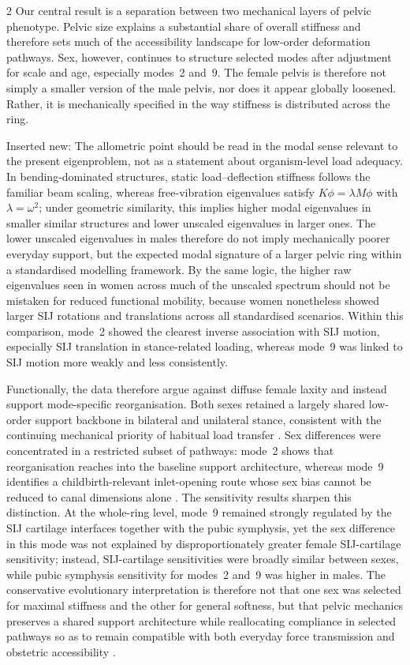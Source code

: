 \documentclass[openacc]{rsproca_new}
\begin{document}
\begin{multicols}{2}
Our central result is a separation between two mechanical layers of pelvic phenotype. Pelvic size explains a substantial share of overall stiffness and therefore sets much of the accessibility landscape for low-order deformation pathways. Sex, however, continues to structure selected modes after adjustment for scale and age, especially modes~2 and~9. The female pelvis is therefore not simply a smaller version of the male pelvis, nor does it appear globally loosened. Rather, it is mechanically specified in the way stiffness is distributed across the ring.

Inserted new: The allometric point should be read in the modal sense relevant to the present eigenproblem, not as a statement about organism-level load adequacy. In bending-dominated structures, static load--deflection stiffness follows the familiar beam scaling, whereas free-vibration eigenvalues satisfy $K\phi=\lambda M\phi$ with $\lambda=\omega^{2}$; under geometric similarity, this implies higher modal eigenvalues in smaller similar structures and lower unscaled eigenvalues in larger ones. The lower unscaled eigenvalues in males therefore do not imply mechanically poorer everyday support, but the expected modal signature of a larger pelvic ring within a standardised modelling framework. By the same logic, the higher raw eigenvalues seen in women across much of the unscaled spectrum should not be mistaken for reduced functional mobility, because women nonetheless showed larger SIJ rotations and translations across all standardised scenarios. Within this comparison, mode~2 showed the clearest inverse association with SIJ motion, especially SIJ translation in stance-related loading, whereas mode~9 was linked to SIJ motion more weakly and less consistently.

Functionally, the data therefore argue against diffuse female laxity and instead support mode-specific reorganisation. Both sexes retained a largely shared low-order support backbone in bilateral and unilateral stance, consistent with the continuing mechanical priority of habitual load transfer \cite{ref_current}. Sex differences were concentrated in a restricted subset of pathways: mode~2 shows that reorganisation reaches into the baseline support architecture, whereas mode~9 identifies a childbirth-relevant inlet-opening route whose sex bias cannot be reduced to canal dimensions alone \cite{ref_current}. The sensitivity results sharpen this distinction. At the whole-ring level, mode~9 remained strongly regulated by the SIJ cartilage interfaces together with the pubic symphysis, yet the sex difference in this mode was not explained by disproportionately greater female SIJ-cartilage sensitivity; instead, SIJ-cartilage sensitivities were broadly similar between sexes, while pubic symphysis sensitivity for modes~2 and~9 was higher in males. The conservative evolutionary interpretation is therefore not that one sex was selected for maximal stiffness and the other for general softness, but that pelvic mechanics preserves a shared support architecture while reallocating compliance in selected pathways so as to remain compatible with both everyday force transmission and obstetric accessibility \cite{ref_current,ref_sensitivity,ref_SIJ_review,ref_SIJ_sex}.



\end{multicols}
\end{document}
